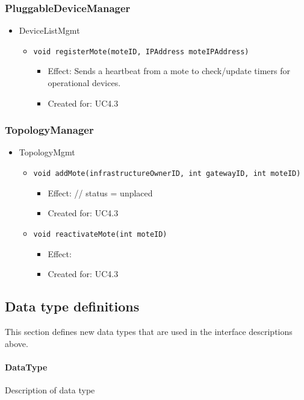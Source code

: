     \subsubsection{PluggableDeviceManager}
        \begin{itemize}
        	\item DeviceListMgmt
        	\begin{itemize}
        		\item \texttt{void registerMote(moteID, IPAddress moteIPAddress)}
        		\begin{itemize}
        			\item Effect: Sends a heartbeat from a mote to check/update timers for operational devices.
        			\item Created for: UC4.3
        		\end{itemize}
        	\end{itemize}
        \end{itemize}

    \subsubsection{TopologyManager}
        \begin{itemize}
        	\item TopologyMgmt
        	\begin{itemize}
        		\item \texttt{void addMote(infrastructureOwnerID, int gatewayID, int moteID)}
        		\begin{itemize}
        			\item Effect: // status = unplaced
        			\item Created for: UC4.3
        		\end{itemize}
                \item \texttt{void reactivateMote(int moteID)}
                    \begin{itemize}
                        \item Effect:
                        \item Created for: UC4.3
                    \end{itemize}
        	\end{itemize}
        \end{itemize}

\subsection{Data type definitions}
    This section defines new data types that are used in the interface descriptions above.

    \paragraph{DataType}
        Description of data type
